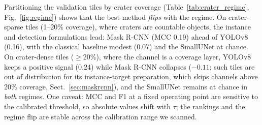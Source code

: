 \documentclass{aa}
\begin{document}
\begin{table}[htbp]
\centering
\caption{Impact crater, full spatial validation set (per-method calibrated threshold $\tau$). The predict-all row labels every pixel crater. MCC is the primary ranking metric; F1/IoU are dominated by the 0.82 base rate.}
\label{tab:crater_allval}
\end{table}

Partitioning the validation tiles by crater coverage (Table~\ref{tab:crater_regime}, Fig.~\ref{fig:regime}) shows that the best method \emph{flips} with the regime. On crater-sparse tiles (1--20\% coverage), where craters are countable objects, the instance and detection formulations lead: Mask R-CNN (MCC 0.19) ahead of YOLOv8 (0.16), with the classical baseline modest (0.07) and the SmallUNet at chance. On crater-dense tiles ($\geq$20\%), where the channel is a coverage layer, YOLOv8 keeps a positive signal (0.24) while Mask R-CNN collapses ($-0.11$; such tiles are out of distribution for its instance-target preparation, which skips channels above 20\% coverage, Sect.~\ref{sec:maskrcnn}), and the SmallUNet remains at chance in \emph{both} regimes. One caveat: MCC and F1 at a fixed operating point are sensitive to the calibrated threshold, so absolute values shift with $\tau$; the rankings and the regime flip are stable across the calibration range we scanned.
\end{document}
